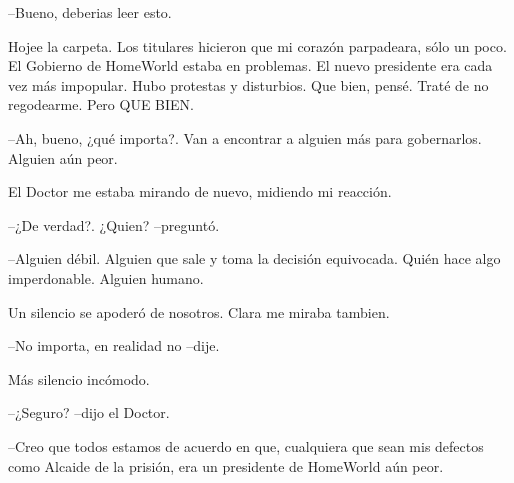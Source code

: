 --Bueno, deberias leer esto.

Hojee la carpeta. Los titulares hicieron que mi corazón parpadeara, sólo
un poco. El Gobierno de HomeWorld estaba en problemas. El nuevo
presidente era cada vez más impopular. Hubo protestas y disturbios. Que
bien, pensé. Traté de no regodearme. Pero QUE BIEN.

--Ah, bueno, ¿qué importa?. Van a encontrar a alguien más para
gobernarlos. Alguien aún peor.

El Doctor me estaba mirando de nuevo, midiendo mi reacción.

--¿De verdad?. ¿Quien? --preguntó.

--Alguien débil. Alguien que sale y toma la decisión equivocada. Quién
hace algo imperdonable. Alguien humano.

Un silencio se apoderó de nosotros. Clara me miraba tambien.

--No importa, en realidad no --dije.

Más silencio incómodo.

--¿Seguro? --dijo el Doctor.

--Creo que todos estamos de acuerdo en que, cualquiera que sean mis
defectos como Alcaide de la prisión, era un presidente de HomeWorld aún
peor.